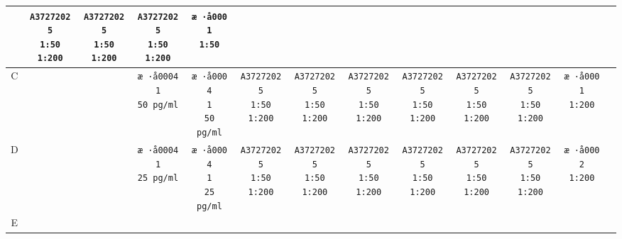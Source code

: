 \documentclass[UTF8,10pt,a4paper,fontset=fandol]{ctexart}
\begin{document}
\begin{center}
{\begin{tabular}{c|c|c|c|c|c|c|c|c|c|c|c|c}
  & \texttt{A37272025\\1:50\\1:200}
  & \texttt{A37272025\\1:50\\1:200}
  & \texttt{A37272025\\1:50\\1:200}
  & \texttt{æ ·å0001\\1:50}
  & \\
\hline
C & &
  & \texttt{æ ·å0004\\1\\50 pg/ml}
  & \texttt{æ ·å0004\\1\\50 pg/ml}
  & \texttt{A37272025\\1:50\\1:200}
  & \texttt{A37272025\\1:50\\1:200}
  & \texttt{A37272025\\1:50\\1:200}
  & \texttt{A37272025\\1:50\\1:200}
  & \texttt{A37272025\\1:50\\1:200}
  & \texttt{A37272025\\1:50\\1:200}
  & \texttt{æ ·å0001\\1:200}
  & \\
\hline
D & &
  & \texttt{æ ·å0004\\1\\25 pg/ml}
  & \texttt{æ ·å0004\\1\\25 pg/ml}
  & \texttt{A37272025\\1:50\\1:200}
  & \texttt{A37272025\\1:50\\1:200}
  & \texttt{A37272025\\1:50\\1:200}
  & \texttt{A37272025\\1:50\\1:200}
  & \texttt{A37272025\\1:50\\1:200}
  & \texttt{A37272025\\1:50\\1:200}
  & \texttt{æ ·å0002\\1:200}
  & \\
\hline
E & &

\end{tabular}}
\end{center}
\end{document}
